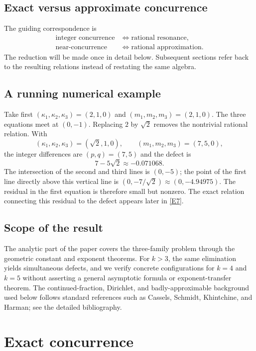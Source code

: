 \documentclass[12pt]{article}
\begin{document}
\subsection{Exact versus approximate concurrence}
The guiding correspondence is
\begin{align*}
\text{integer concurrence}
&\Longleftrightarrow
\text{rational resonance},\\
\text{near-concurrence}
&\Longleftrightarrow
\text{rational approximation}.
\end{align*}
The reduction will be made once in detail below. Subsequent sections refer back to the resulting relations instead of restating the same algebra.

\subsection{A running numerical example}
Take first
$(\kappa_1,\kappa_2,\kappa_3)=(2,1,0)$ and
$(m_1,m_2,m_3)=(2,1,0)$. The three equations meet at $(0,-1)$.
Replacing $2$ by $\sqrt2$ removes the nontrivial rational relation. With
\[
(\kappa_1,\kappa_2,\kappa_3)=(\sqrt2,1,0),
\qquad
(m_1,m_2,m_3)=(7,5,0),
\]
the integer differences are $(p,q)=(7,5)$ and the defect is
\[
7-5\sqrt2\approx-0.071068.
\]
The intersection of the second and third lines is $(0,-5)$; the point of the first line directly above this vertical line is $(0,-7/\sqrt2)\approx(0,-4.94975)$. The residual in the first equation is therefore small but nonzero. The exact relation connecting this residual to the defect appears later in \eqref{E7}.

\subsection{Scope of the result}
The analytic part of the paper covers the three-family problem through the geometric constant and exponent theorems. For $k>3$, the same elimination yields simultaneous defects, and we verify concrete configurations for $k=4$ and $k=5$ without asserting a general asymptotic formula or exponent-transfer theorem. The continued-fraction, Dirichlet, and badly-approximable background used below follows standard references such as Cassels, Schmidt, Khintchine, and Harman; see the detailed bibliography.

\section{Exact concurrence}
\end{document}
